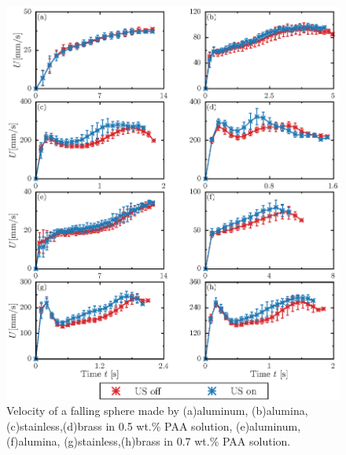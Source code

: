 \begin{figure}[H]
    \centering
    \includegraphics[width=1.0\textwidth]{5-Results/0.5-0.7.eps}
    \caption{Velocity of a falling sphere made by (a)aluminum, (b)alumina, (c)stainless,(d)brass in 0.5 wt.\% PAA solution, (e)aluminum, (f)alumina, (g)stainless,(h)brass in 0.7 wt.\% PAA solution.}
    \label{fig:0.5-0.7}
\end{figure}

